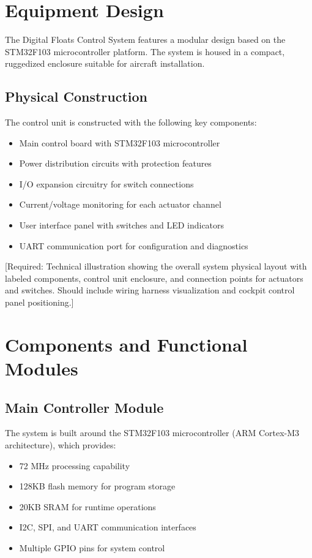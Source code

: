 \documentclass[12pt,a4paper,twoside,openright]{book}
\begin{document}
\section{Equipment Design}

The Digital Floats Control System features a modular design based on the STM32F103 microcontroller platform. The system is housed in a compact, ruggedized enclosure suitable for aircraft installation.

\subsection{Physical Construction}
The control unit is constructed with the following key components:
\begin{itemize}
    \item Main control board with STM32F103 microcontroller
    \item Power distribution circuits with protection features
    \item I/O expansion circuitry for switch connections
    \item Current/voltage monitoring for each actuator channel
    \item User interface panel with switches and LED indicators
    \item UART communication port for configuration and diagnostics
\end{itemize}

{\color{missingred}[Required: Technical illustration showing the overall system physical layout with labeled components, control unit enclosure, and connection points for actuators and switches. Should include wiring harness visualization and cockpit control panel positioning.]}

\section{Components and Functional Modules}

\subsection{Main Controller Module}
The system is built around the STM32F103 microcontroller (ARM Cortex-M3 architecture), which provides:
\begin{itemize}
    \item 72 MHz processing capability
    \item 128KB flash memory for program storage
    \item 20KB SRAM for runtime operations
    \item I2C, SPI, and UART communication interfaces
    \item Multiple GPIO pins for system control
\end{itemize}
\end{document}
